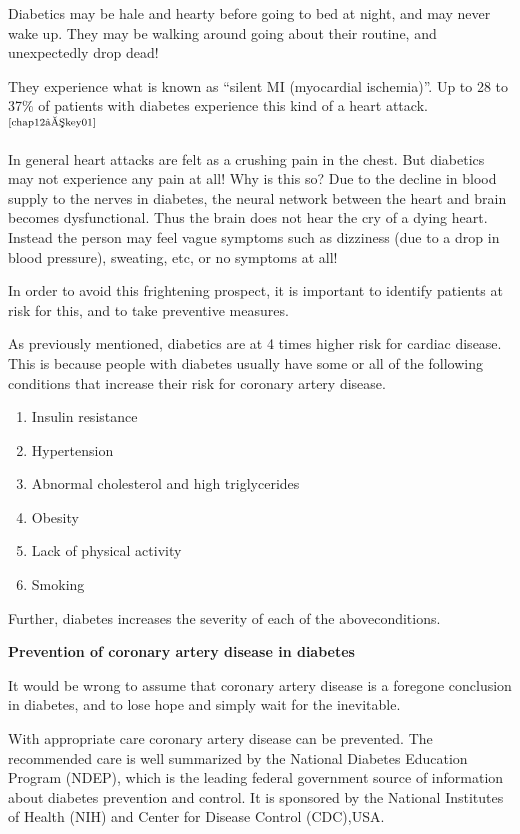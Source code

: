 Diabetics may be hale and hearty before going to bed at night, and may never wake up. They may be walking around going about their routine, and unexpectedly drop dead!

They experience what is known as “silent MI (myocardial ischemia)”. Up to 28 to 37\% of patients with diabetes experience this kind of a heart attack.$^{\text{\cite{chap12–key01}}}$

In general heart attacks are felt as a crushing pain in the chest. But diabetics may not experience any pain at all! Why is this so? Due to the decline in blood supply to the nerves in diabetes, the neural network between the heart and brain becomes dysfunctional. Thus the brain does not hear the cry of a dying heart. Instead the person may feel vague symptoms such as dizziness (due to a drop in blood pressure), sweating, etc, or no symptoms at all!

In order to avoid this frightening prospect, it is important to identi\-fy patients at risk for this, and to take preventive measures.


As previously mentioned, diabetics are at 4 times higher risk for cardiac disease. This is because people with diabetes usually have some or all of the following conditions that increase their risk for coronary artery disease.

\begin{enumerate}[•]
\itemsep=0pt
\item Insulin resistance
\item Hypertension
\item Abnormal cholesterol and high triglycerides
\item Obesity
\item Lack of physical activity
\item Smoking
\end{enumerate}

Further, diabetes increases the severity of each of the above\break conditions.

\noindent\textbf{Prevention of coronary artery disease in diabetes}

It would be wrong to assume that coronary artery disease is a foregone conclusion in diabetes, and to lose hope and simply wait for the inevitable.

With appropriate care coronary artery disease can be prevented. The recommended care is well summarized by the National Diabetes Education Program (NDEP), which is the leading federal government source of information about diabetes prevention and control. It is spo\-nsored by the National Institutes of Health (NIH) and Center for Disease Control (CDC),USA.


